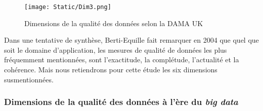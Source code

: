 \begin{enumerate}
\begin{figure}[!h]
  \caption{Dimensions de la qualit\'e des donn\'ees selon la DAMA UK}  \label{fig:dama_uk}
  \begin{center}
    \texttt{[image: Static/Dim3.png]} 
  \end{center}
\end{figure}

\end{enumerate}
\vspace {0.5cm}

Dans une tentative de synth\`ese, Berti-Equille \cite{BertiEquille2004} fait remarquer en 2004 que quel que soit le domaine d’application, les mesures de qualité de données les plus fréquemment mentionnées, sont l'exactitude, la complétude, l’actualité et la cohérence. Mais nous retiendrons pour cette \'etude les six dimensions susmentionn\'ees.

\subsubsection{\textbf{Dimensions de la qualit\'e des donn\'ees \`a l'\`ere du \textit{big data}}}

